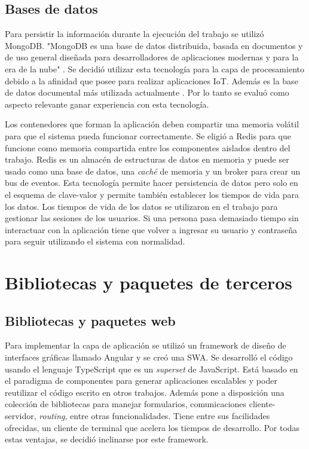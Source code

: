 \subsection{Bases de datos}
Para persistir la información durante la ejecución del trabajo se utilizó MongoDB.
"MongoDB es una base de datos distribuida, basada en documentos y de uso general diseñada para desarrolladores de aplicaciones modernas y para la era de la nube" \citep{WEBSITE:MongoHome}.
Se decidió utilizar esta tecnología para la capa de procesamiento debido a la afinidad que posee para realizar aplicaciones IoT.
Además es la base de datos documental más utilizada actualmente \citep{WEBSITE:DBRanking}.
Por lo tanto se evaluó como aspecto relevante ganar experiencia con esta tecnología.

Los contenedores que forman la aplicación deben compartir una memoria volátil para que el sistema pueda funcionar correctamente.
Se eligió a Redis para que funcione como memoria compartida entre los componentes aislados dentro del trabajo.
Redis es un almacén de estructuras de datos en memoria y puede ser usado como una base de datos, una \emph{caché} de memoria y un broker para crear un bus de eventos.
Esta tecnología permite hacer persistencia de datos pero solo en el esquema de clave-valor y permite también establecer los tiempos de vida para los datos.
Los tiempos de vida de los datos se utilizaron en el trabajo para gestionar las sesiones de los usuarios.
Si una persona pasa demasiado tiempo sin interactuar con la aplicación tiene que volver a ingresar su usuario y contraseña para seguir utilizando el sistema con normalidad.	
	
\section{Bibliotecas y paquetes de terceros}

\subsection{Bibliotecas y paquetes web}
Para implementar la capa de aplicación se utilizó un framework de diseño de interfaces gráficas llamado Angular y se creó una SWA.
Se desarrolló el código usando el lenguaje TypeScript que es un \emph{superset} de JavaScript.
Está basado en el paradigma de componentes para generar aplicaciones escalables y poder reutilizar el código escrito en otros trabajos.
Además pone a disposición una colección de bibliotecas para manejar formularios, comunicaciones cliente-servidor, \emph{routing}, entre otras funcionalidades.
Tiene entre sus facilidades ofrecidas, un cliente de terminal que acelera los tiempos de desarrollo.
Por todas estas ventajas, se decidió inclinarse por este framework.

